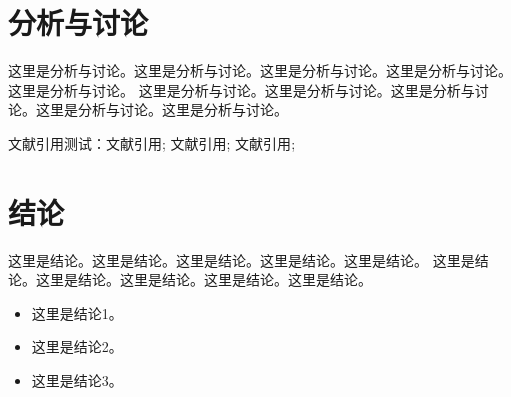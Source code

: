 \section{分析与讨论}

这里是分析与讨论。这里是分析与讨论。这里是分析与讨论。这里是分析与讨论。这里是分析与讨论。
这里是分析与讨论。这里是分析与讨论。这里是分析与讨论。这里是分析与讨论。这里是分析与讨论。


文献引用测试：文献引用\cite{CHEN20092657}; 文献引用\cite{CHEN20092657,Tang2023,Yin2021}; 文献引用\cite{CHEN20092657,Tang2023,ZHU2023119062};


\section{结论}

这里是结论。这里是结论。这里是结论。这里是结论。这里是结论。
这里是结论。这里是结论。这里是结论。这里是结论。这里是结论。


\begin{itemize}
    \item 这里是结论1。
    \item 这里是结论2。
    \item 这里是结论3。
\end{itemize}


\newpage
